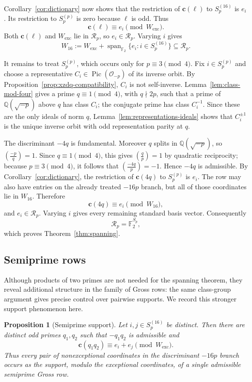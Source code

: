 \documentclass[11pt]{amsart}
\newtheorem{proposition}[theorem]{Proposition}
\theoremstyle{definition}
\theoremstyle{remark}
\newcommand{\Q}{\mathbb{Q}}
\newcommand{\F}{\mathbb{F}}
\newcommand{\OO}{\mathcal{O}}
\newcommand{\Pic}{\operatorname{Pic}}
\newcommand{\Span}{\operatorname{span}}
\newcommand{\leg}[2]{\left(\frac{#1}{#2}\right)}
\newcommand{\crow}{\mathbf{c}}
\newcommand{\Rp}{\mathcal{R}_p}
\begin{document}
Corollary~\ref{cor:dictionary} now shows that the restriction of $\crow(\ell)$ to $S_p^{(16)}$ is $e_i$.  Its restriction to $S_p^{(p)}$ is zero because $\ell$ is odd.  Thus
\[
  \crow(\ell)\equiv e_i\pmod{W_{\mathrm{exc}}}.
\]
Both $\crow(\ell)$ and $W_{\mathrm{exc}}$ lie in $\Rp$, so $e_i\in\Rp$.  Varying $i$ gives
\[
  W_{16}:=W_{\mathrm{exc}}+
  \Span_{\F_2}\{e_i:i\in S_p^{(16)}\}
  \subseteq\Rp.
\]


It remains to treat $S_p^{(p)}$, which occurs only for $p\equiv3\pmod4$.  Fix $i\in S_p^{(p)}$ and choose a representative $C_i\in\Pic(\OO_{-p})$ of its inverse orbit.  By Proposition~\ref{prop:xzdq-compatibility}, $C_i$ is not self-inverse.  Lemma~\ref{lem:class-mod-four} gives a prime $q\equiv1\pmod4$, with $q\nmid2p$, such that a prime of $\Q(\sqrt{-p})$ above $q$ has class $C_i$; the conjugate prime has class $C_i^{-1}$.  Since these are the only ideals of norm $q$, Lemma~\ref{lem:representations-ideals} shows that $C_i^{\pm1}$ is the unique inverse orbit with odd representation parity at $q$.

The discriminant $-4q$ is fundamental. Moreover $q$ splits in $\Q(\sqrt{-p})$, so $\leg{-p}{q}=1$. Since $q\equiv1\pmod4$, this gives $\leg{q}{p}=1$ by quadratic reciprocity; because $p\equiv3\pmod4$, it follows that $\leg{-4q}{p}=-1$.  Hence $-4q$ is admissible.  By Corollary~\ref{cor:dictionary}, the restriction of $\crow(4q)$ to $S_p^{(p)}$ is $e_i$.  The row may also have entries on the already treated $-16p$ branch, but all of those coordinates lie in $W_{16}$.  Therefore
\[
  \crow(4q)\equiv e_i\pmod{W_{16}},
\]
and $e_i\in\Rp$.  Varying $i$ gives every remaining standard basis vector.  Consequently
\[
  \Rp=\F_2^{S_p},
\]
which proves Theorem~\ref{thm:spanning}.

\subsection{Semiprime rows}

Although products of two primes are not needed for the spanning theorem,
they reveal additional structure in the family of Gross rows: the same
class-group argument gives precise control over pairwise supports. We record
this stronger support phenomenon here.

\begin{proposition}[Semiprime support]
\label{prop:semiprime-support}
Let $i,j\in S_p^{(16)}$ be distinct. Then there are distinct odd primes
$q_1,q_2$ such that $-q_1q_2$ is admissible and
\[
  \crow(q_1q_2)\equiv e_i+e_j\pmod{W_{\mathrm{exc}}}.
\]
Thus every pair of nonexceptional coordinates in the discriminant $-16p$
branch occurs as the support, modulo the exceptional coordinates, of a
single admissible semiprime Gross row.
\end{proposition}
\end{document}
